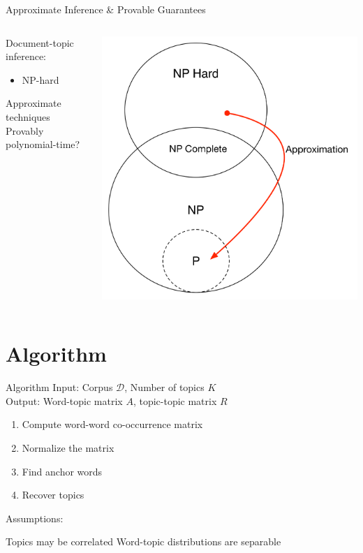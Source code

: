 \documentclass{lecture}
\begin{document}
\begin{plain}{Approximate Inference \& Provable Guarantees}
\begin{columns}
\begin{itemize}
	\p Document-topic inference:
	\begin{itemize}
		\item NP-hard
	\end{itemize}	
	\p Approximate techniques
	\p Provably polynomial-time?
\end{itemize}
\includegraphics[scale=0.4]{figs/np_approx}
\end{columns}
\end{plain}


\section[Algorithm]{Algorithm}

\begin{plain}{Algorithm}
Input: Corpus $\mathcal{D}$, Number of topics $K$\\
\vspace{1ex}
Output: Word-topic matrix $A$, topic-topic matrix $R$\\
\begin{enumerate}
	\item Compute word-word co-occurrence matrix
	\item Normalize the matrix
	\item Find anchor words
	\item Recover topics
\end{enumerate}
\vspace{1ex}
Assumptions:
	\begin{itemize}
		\p Topics may be correlated
		\p Word-topic distributions are separable
	\end{itemize}
\end{plain}
\end{document}
